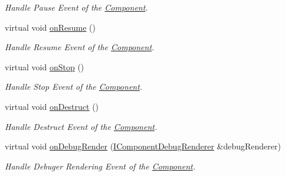 \begin{DoxyCompactItemize}
\begin{DoxyCompactList}\small\item\em Handle Pause Event of the \hyperlink{class_magnum_1_1_component}{Component}. \end{DoxyCompactList}\item 
virtual void \hyperlink{class_magnum_1_1_particle_emitter_a6a9fb6790359865382adfc3aecb2dae6}{on\+Resume} ()\hypertarget{class_magnum_1_1_particle_emitter_a6a9fb6790359865382adfc3aecb2dae6}{}\label{class_magnum_1_1_particle_emitter_a6a9fb6790359865382adfc3aecb2dae6}

\begin{DoxyCompactList}\small\item\em Handle Resume Event of the \hyperlink{class_magnum_1_1_component}{Component}. \end{DoxyCompactList}\item 
virtual void \hyperlink{class_magnum_1_1_particle_emitter_ab9e572fca821896a01b3276a77227593}{on\+Stop} ()\hypertarget{class_magnum_1_1_particle_emitter_ab9e572fca821896a01b3276a77227593}{}\label{class_magnum_1_1_particle_emitter_ab9e572fca821896a01b3276a77227593}

\begin{DoxyCompactList}\small\item\em Handle Stop Event of the \hyperlink{class_magnum_1_1_component}{Component}. \end{DoxyCompactList}\item 
virtual void \hyperlink{class_magnum_1_1_particle_emitter_a2ff7eed6a6075bb8506261a9d1c6d1f9}{on\+Destruct} ()\hypertarget{class_magnum_1_1_particle_emitter_a2ff7eed6a6075bb8506261a9d1c6d1f9}{}\label{class_magnum_1_1_particle_emitter_a2ff7eed6a6075bb8506261a9d1c6d1f9}

\begin{DoxyCompactList}\small\item\em Handle Destruct Event of the \hyperlink{class_magnum_1_1_component}{Component}. \end{DoxyCompactList}\item 
virtual void \hyperlink{class_magnum_1_1_particle_emitter_abb855f39844e600998adec2736008399}{on\+Debug\+Render} (\hyperlink{class_magnum_1_1_i_component_debug_renderer}{I\+Component\+Debug\+Renderer} \&debug\+Renderer)\hypertarget{class_magnum_1_1_particle_emitter_abb855f39844e600998adec2736008399}{}\label{class_magnum_1_1_particle_emitter_abb855f39844e600998adec2736008399}

\begin{DoxyCompactList}\small\item\em Handle Debuger Rendering Event of the \hyperlink{class_magnum_1_1_component}{Component}. \end{DoxyCompactList}\end{DoxyCompactItemize}
